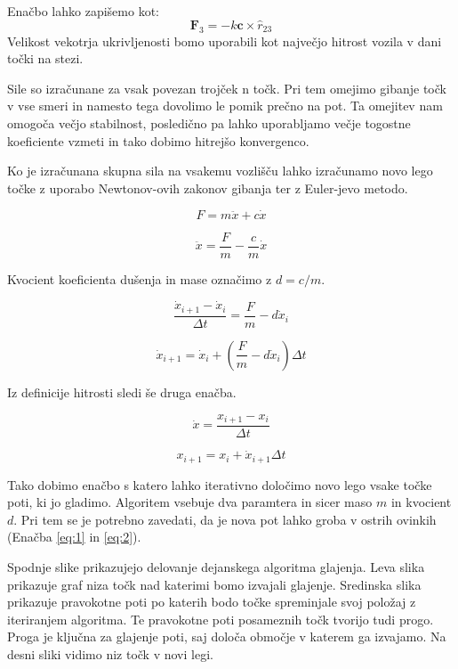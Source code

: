 Enačbo lahko zapišemo kot:
\begin{equation}
\mathbf{F}_3 = -k \mathbf{c} \times \hat{r}_{23}
\end{equation}
Velikost vekotrja ukrivljenosti bomo uporabili kot največjo hitrost vozila v dani točki na stezi.

Sile so izračunane za vsak povezan trojček n točk. Pri tem omejimo gibanje točk v vse smeri in namesto tega dovolimo le pomik prečno na pot. Ta omejitev nam omogoča večjo stabilnost, posledično pa lahko uporabljamo večje togostne koeficiente vzmeti in tako dobimo hitrejšo konvergenco.

Ko je izračunana skupna sila na vsakemu vozlišču lahko izračunamo novo lego točke z uporabo Newtonov-ovih zakonov gibanja ter z Euler-jevo metodo.

\begin{equation}
F = m \ddot{x} + c \dot{x}
\end{equation}

\begin{equation}
\ddot{x} = \frac{F}{m} - \frac{c}{m} \dot{x}
\end{equation}

Kvocient koeficienta dušenja in mase označimo z $d = c / m$.

\begin{equation}
\frac{\dot{x}_{i+1} - \dot{x}_i}{\Delta t} = \frac{F}{m} - d \dot{x}_i
\end{equation}

\begin{equation}
\dot{x}_{i+1} = \dot{x}_i + (\frac{F}{m} - d \dot{x}_i)\Delta t
\end{equation}

Iz definicije hitrosti sledi še druga enačba.

\begin{equation}
\dot{x} = \frac{x_{i+1} - x_i}{\Delta t}
\end{equation}

\begin{equation} \label{eq:16}
x_{i + 1} = x_{i} + \dot{x}_{i + 1} \Delta t 
\end{equation}

Tako dobimo enačbo s katero lahko iterativno določimo novo lego vsake točke poti, ki jo gladimo. Algoritem vsebuje dva paramtera in sicer maso $m$ in kvocient $d$. Pri tem se je potrebno zavedati, da je nova pot lahko groba v ostrih ovinkih (Enačba \ref{eq:1} in \ref{eq:2}).

Spodnje slike prikazujejo delovanje dejanskega algoritma glajenja. Leva slika prikazuje graf niza točk nad katerimi bomo  izvajali glajenje. Sredinska slika prikazuje pravokotne poti po katerih bodo točke spreminjale svoj položaj z iteriranjem algoritma. Te pravokotne poti posameznih točk tvorijo tudi progo. Proga je ključna za glajenje poti, saj določa območje v katerem ga izvajamo. Na desni sliki vidimo niz točk v novi legi.

